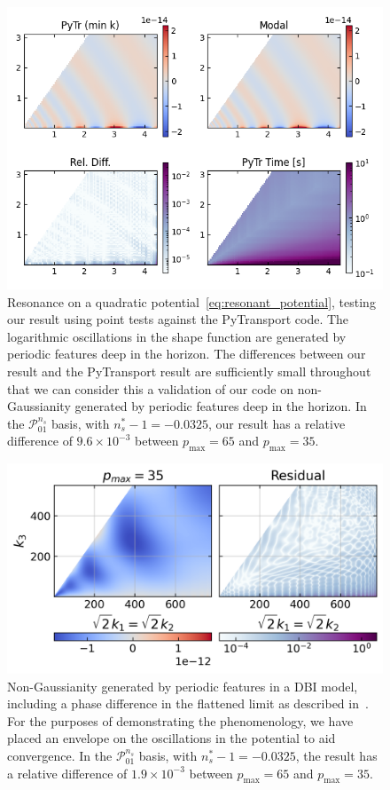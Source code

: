 \documentclass[a4paper,12pt]{extarticle}
\newcommand{\Pmax}{p_\text{max}}
\newcommand{\Lnsboth}{\mathcal{P}^{n_s}_{01}}
\begin{document}
\begin{figure}[!pth]
\centering
\includegraphics[width=0.99\columnwidth]{plots/slice_min_100.png}
\caption{
    Resonance on a quadratic potential~\eqref{eq:resonant_potential},
    testing our result using point tests against the
    PyTransport code.
    The logarithmic oscillations in the shape function are generated by periodic
    features deep in the horizon.
    The differences between our result and the PyTransport result
    are sufficiently small throughout that we can consider this
    a validation of our code on non-Gaussianity generated by periodic
    features deep in the horizon.
    In the $\Lnsboth$ basis, with $n_s^{*}-1 = -0.0325$,
    our result has a relative difference of $9.6\times10^{-3}$
    between $\Pmax=65$ and $\Pmax=35$.
}\label{pytr_comparison_min}
\end{figure}

\begin{figure}[!pth]
\centering
\includegraphics[width=0.99\columnwidth]{plots/tetra_slice_dbi_reso_bump_hq_coolwarm.png}
\caption{
    Non-Gaussianity generated by periodic
    features in a DBI model, including a phase difference
    in the flattened limit as described in~\cite{chen_folded_resonant}.
    For the purposes of demonstrating the phenomenology,
    we have placed an envelope on the oscillations in the potential
    to aid convergence.
    In the $\Lnsboth$ basis, with $n_s^{*}-1 = -0.0325$,
    the result has a relative difference of $1.9\times10^{-3}$
    between $\Pmax=65$ and $\Pmax=35$.
}\label{slice_plot_dbi_reso}
\end{figure}
\end{document}
